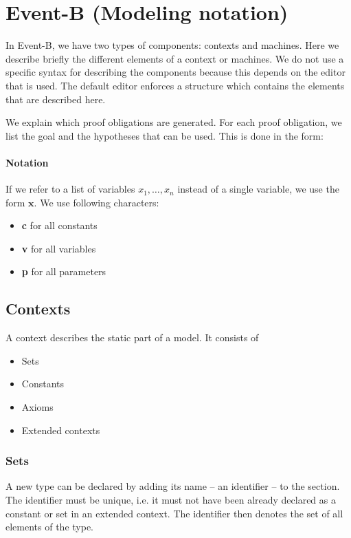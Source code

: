 \newcommand{\varlist}[1]{\textbf{#1}}

\section{Event-B (Modeling notation)}
\label{reference_02}

In Event-B, we have two types of components: contexts and machines.
Here we describe briefly the different elements of a context or machines.
We do not use a specific syntax for describing the components because this depends on the editor that is
used. The default editor enforces a structure which contains the elements that are described here.

We explain which proof obligations are generated.
For each proof obligation, we list the goal and the hypotheses that can be used.
This is done in the form:

\paragraph{Notation}
If we refer to a list of variables $x_1,\ldots,x_n$ instead of a single variable, we use the form $\varlist{x}$. We use following characters:
\begin{itemize}
\item \varlist{c} for all constants
\item \varlist{v} for all variables
\item \varlist{p} for all parameters
\end{itemize}


\subsection{Contexts}
A context describes the static part of a model. It consists of
\begin{itemize}
\item Sets
\item Constants
\item Axioms
\item Extended contexts
\end{itemize}

\subsubsection{Sets}
\label{sets}
A new type can be declared by adding its name -- an identifier -- to the  section.
The identifier must be unique, i.e. it must not have been already declared as a constant or set in an extended context.
The identifier then denotes the set of all elements of the type. 

